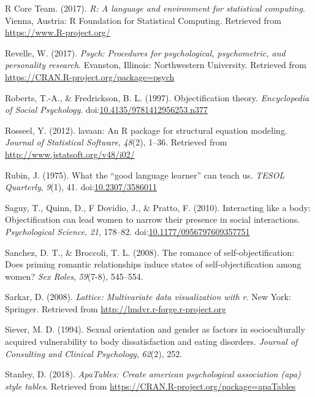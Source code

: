 \documentclass[
  man]{apa6}
\begin{document}
\hypertarget{ref-R-base}{}
R Core Team. (2017). \emph{R: A language and environment for statistical
computing}. Vienna, Austria: R Foundation for Statistical Computing.
Retrieved from \url{https://www.R-project.org/}

\hypertarget{ref-R-psych}{}
Revelle, W. (2017). \emph{Psych: Procedures for psychological,
psychometric, and personality research}. Evanston, Illinois:
Northwestern University. Retrieved from
\url{https://CRAN.R-project.org/package=psych}

\hypertarget{ref-robertsfredrickson}{}
Roberts, T.-A., \& Fredrickson, B. L. (1997). Objectification theory.
\emph{Encyclopedia of Social Psychology}.
doi:\href{https://doi.org/10.4135/9781412956253.n377}{10.4135/9781412956253.n377}

\hypertarget{ref-R-lavaan}{}
Rosseel, Y. (2012). lavaan: An R package for structural equation
modeling. \emph{Journal of Statistical Software}, \emph{48}(2), 1--36.
Retrieved from \url{http://www.jstatsoft.org/v48/i02/}

\hypertarget{ref-rubin1975}{}
Rubin, J. (1975). What the ``good language learner'' can teach us.
\emph{TESOL Quarterly}, \emph{9}(1), 41.
doi:\href{https://doi.org/10.2307/3586011}{10.2307/3586011}

\hypertarget{ref-saguyetal2010}{}
Saguy, T., Quinn, D., F Dovidio, J., \& Pratto, F. (2010). Interacting
like a body: Objectification can lead women to narrow their presence in
social interactions. \emph{Psychological Science}, \emph{21}, 178--82.
doi:\href{https://doi.org/10.1177/0956797609357751}{10.1177/0956797609357751}

\hypertarget{ref-sanchez2008romance}{}
Sanchez, D. T., \& Broccoli, T. L. (2008). The romance of
self-objectification: Does priming romantic relationships induce states
of self-objectification among women? \emph{Sex Roles}, \emph{59}(7-8),
545--554.

\hypertarget{ref-R-lattice}{}
Sarkar, D. (2008). \emph{Lattice: Multivariate data visualization with
r}. New York: Springer. Retrieved from
\url{http://lmdvr.r-forge.r-project.org}

\hypertarget{ref-siever1994sexual}{}
Siever, M. D. (1994). Sexual orientation and gender as factors in
socioculturally acquired vulnerability to body dissatisfaction and
eating disorders. \emph{Journal of Consulting and Clinical Psychology},
\emph{62}(2), 252.

\hypertarget{ref-R-apaTables}{}
Stanley, D. (2018). \emph{ApaTables: Create american psychological
association (apa) style tables}. Retrieved from
\url{https://CRAN.R-project.org/package=apaTables}
\end{document}
